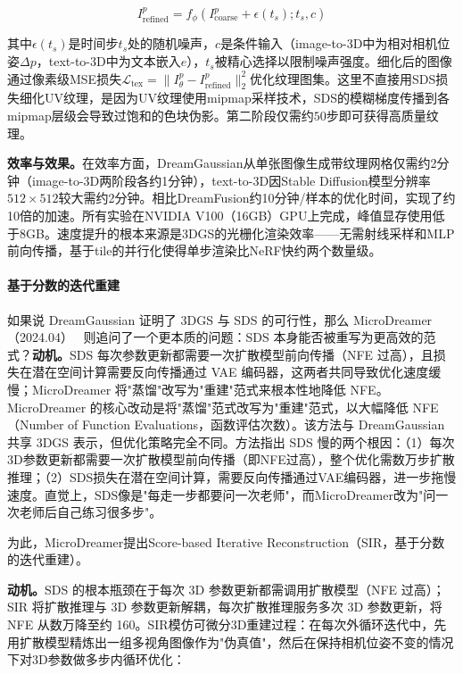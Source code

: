 \begin{equation}
\label{eq:dg_uv}
I^p_\text{refined} = f_\phi(I^p_\text{coarse} + \epsilon(t_s); t_s, c)
\end{equation}

其中$\epsilon(t_s)$是时间步$t_s$处的随机噪声，$c$是条件输入（image-to-3D中为相对相机位姿$\Delta p$，text-to-3D中为文本嵌入$e$），$t_s$被精心选择以限制噪声强度。细化后的图像通过像素级MSE损失$\mathcal{L}_\text{tex} = \|I^p_\theta - I^p_\text{refined}\|_2^2$优化纹理图集。这里不直接用SDS损失细化UV纹理，是因为UV纹理使用mipmap采样技术，SDS的模糊梯度传播到各mipmap层级会导致过饱和的色块伪影。第二阶段仅需约$50$步即可获得高质量纹理。

\textbf{效率与效果。}在效率方面，DreamGaussian从单张图像生成带纹理网格仅需约2分钟（image-to-3D两阶段各约1分钟），text-to-3D因Stable Diffusion模型分辨率$512 \times 512$较大需约2分钟。相比DreamFusion约10分钟/样本的优化时间，实现了约10倍的加速。所有实验在NVIDIA V100（16GB）GPU上完成，峰值显存使用低于8GB。速度提升的根本来源是3DGS的光栅化渲染效率——无需射线采样和MLP前向传播，基于tile的并行化使得单步渲染比NeRF快约两个数量级。

\paragraph{基于分数的迭代重建}

如果说 DreamGaussian 证明了 3DGS 与 SDS 的可行性，那么 MicroDreamer（2024.04）~\cite{2404_19525} 则追问了一个更本质的问题：SDS 本身能否被重写为更高效的范式？\textbf{动机。}SDS 每次参数更新都需要一次扩散模型前向传播（NFE 过高），且损失在潜在空间计算需要反向传播通过 VAE 编码器，这两者共同导致优化速度缓慢；MicroDreamer 将"蒸馏"改写为"重建"范式来根本性地降低 NFE。MicroDreamer 的核心改动是将"蒸馏"范式改写为"重建"范式，以大幅降低 NFE（Number of Function Evaluations，函数评估次数）。该方法与 DreamGaussian 共享 3DGS 表示，但优化策略完全不同。方法指出 SDS 慢的两个根因：（1）每次3D参数更新都需要一次扩散模型前向传播（即NFE过高），整个优化需数万步扩散推理；（2）SDS损失在潜在空间计算，需要反向传播通过VAE编码器，进一步拖慢速度。直觉上，SDS像是"每走一步都要问一次老师"，而MicroDreamer改为"问一次老师后自己练习很多步"。

为此，MicroDreamer提出Score-based Iterative Reconstruction（SIR，基于分数的迭代重建）。

\textbf{动机。}SDS 的根本瓶颈在于每次 3D 参数更新都需调用扩散模型（NFE 过高）；SIR 将扩散推理与 3D 参数更新解耦，每次扩散推理服务多次 3D 参数更新，将 NFE 从数万降至约 160。SIR模仿可微分3D重建过程：在每次外循环迭代中，先用扩散模型精炼出一组多视角图像作为"伪真值"，然后在保持相机位姿不变的情况下对3D参数做多步内循环优化：

